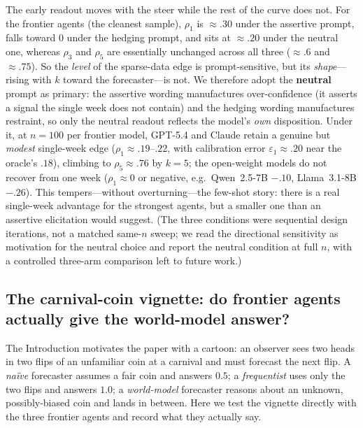 The early readout moves with the steer while the rest of the curve does not. For the frontier agents
(the cleanest sample), $\rho_1$ is ${\approx}.30$ under the assertive prompt, falls toward $0$ under
the hedging prompt, and sits at ${\approx}.20$ under the neutral one, whereas $\rho_3$ and $\rho_5$
are essentially unchanged across all three (${\approx}.6$ and ${\approx}.75$). So the \emph{level} of
the sparse-data edge is prompt-sensitive, but its \emph{shape}---rising with $k$ toward the
forecaster---is not. We therefore adopt the \textbf{neutral} prompt as primary: the assertive wording
manufactures over-confidence (it asserts a signal the single week does not contain) and the hedging
wording manufactures restraint, so only the neutral readout reflects the model's \emph{own}
disposition. Under it, at $n{=}100$ per frontier model, GPT-5.4 and Claude retain a genuine but
\emph{modest} single-week edge ($\rho_1{\approx}.19$--$.22$, with calibration error
$\varepsilon_1{\approx}.20$ near the oracle's $.18$), climbing to $\rho_5{\approx}.76$ by $k{=}5$; the open-weight models do not recover from one week
($\rho_1{\approx}0$ or negative, e.g.\ Qwen~2.5-7B $-.10$, Llama~3.1-8B $-.26$). This
tempers---without overturning---the few-shot story: there is a real single-week advantage for the
strongest agents, but a smaller one than an assertive elicitation would suggest. (The three
conditions were sequential design iterations, not a matched same-$n$ sweep; we read the directional
sensitivity as motivation for the neutral choice and report the neutral condition at full $n$, with a
controlled three-arm comparison left to future work.)

\subsection{The carnival-coin vignette: do frontier agents actually give the world-model answer?}
\label{app:exp2-carnival}

The Introduction motivates the paper with a cartoon: an observer sees two heads in two flips of
an unfamiliar coin at a carnival and must forecast the next flip.  A \emph{na\"ive} forecaster
assumes a fair coin and answers $0.5$; a \emph{frequentist} uses only the two flips and answers
$1.0$; a \emph{world-model} forecaster reasons about an unknown, possibly-biased coin and lands in
between. Here we test the vignette directly with
the three frontier agents and record what they actually say.

